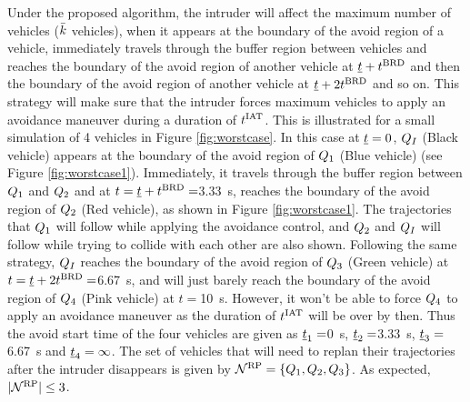 Under the proposed algorithm, the intruder will affect the maximum number of vehicles ($\bar{k}$ vehicles), when it appears at the boundary of the avoid region of a vehicle, immediately travels through the buffer region between vehicles and reaches the boundary of the avoid region of another vehicle at $\underline{t} + t^\text{BRD}$ and then the boundary of the avoid region of another vehicle at $\underline{t} + 2t^\text{BRD}$ and so on. This strategy will make sure that the intruder forces maximum vehicles to apply an avoidance maneuver during a duration of $t^\text{IAT}$. This is illustrated for a small simulation of 4 vehicles in Figure \ref{fig:worstcase}. In this case at $\underline{t} = 0$, $Q_{I}$ (Black vehicle) appears at the boundary of the avoid region of $Q_1$ (Blue vehicle) (see Figure \ref{fig:worstcase1}). Immediately, it travels through the buffer region between $Q_1$ and $Q_2$ and at $t = \underline{t} + t^\text{BRD} = $\SI{3.33}{\s}, reaches the boundary of the avoid region of $Q_2$ (Red vehicle), as shown in Figure \ref{fig:worstcase1}. The trajectories that $Q_1$ will follow while applying the avoidance control, and $Q_2$ and $Q_{I}$ will follow while trying to collide with each other are also shown. Following the same strategy, $Q_{I}$ reaches the boundary of the avoid region of $Q_3$ (Green vehicle) at $t = \underline{t} + 2t^\text{BRD} = $\SI{6.67}{\s}, and will just barely reach the boundary of the avoid region of $Q_4$ (Pink vehicle) at $t = $\SI{10}{\s}. However, it won't be able to force $Q_4$ to apply an avoidance maneuver as the duration of $t^\text{IAT}$ will be over by then. Thus the avoid start time of the four vehicles are given as $\underline{t}_1 = $\SI{0}{\s}, $\underline{t}_2 = $\SI{3.33}{\s}, $\underline{t}_3 = $\SI{6.67}{\s} and $\underline{t}_4 = \infty$. The set of vehicles that will need to replan their trajectories after the intruder disappears is given by $\mathcal{N}^\text{RP} = \{Q_1, Q_2, Q_3\}$. As expected, $|\mathcal{N}^\text{RP}| \leq 3$.    
